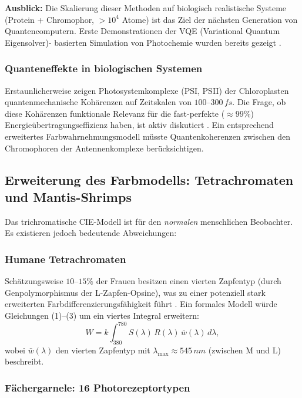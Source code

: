 ﻿\documentclass[a4paper,12pt]{article}
\theoremstyle{definition}
\begin{document}
\textbf{Ausblick:} Die Skalierung dieser Methoden auf biologisch realistische Systeme
(Protein + Chromophor, $> 10^4$ Atome) ist das Ziel der nächsten Generation von
Quantencomputern. Erste Demonstrationen der VQE (Variational Quantum Eigensolver)-
basierten Simulation von Photochemie wurden bereits gezeigt \cite{google2020}.

\subsubsection{Quanteneffekte in biologischen Systemen}

Erstaunlicherweise zeigen Photosystemkomplexe (PSI, PSII) der Chloroplasten
quantenmechanische Kohärenzen auf Zeitskalen von $100$--$300\,\si{fs}$.
Die Frage, ob diese Kohärenzen funktionale Relevanz für die fast-perfekte
($\approx 99\%$) Energieübertragungseffizienz haben, ist aktiv diskutiert
\cite{engel2007}. Ein entsprechend erweitertes Farbwahrnehmungsmodell
müsste Quantenkoherenzen zwischen den Chromophoren der Antennenkomplexe
berücksichtigen.

\subsection{Erweiterung des Farbmodells: Tetrachromaten und Mantis-Shrimps}

Das trichromatische CIE-Modell ist für den \emph{normalen} menschlichen Beobachter.
Es existieren jedoch bedeutende Abweichungen:

\subsubsection{Humane Tetrachromaten}

Schätzungsweise $10$--$15\%$ der Frauen besitzen einen vierten Zapfentyp
(durch Genpolymorphismus der L-Zapfen-Opsine), was zu einer potenziell
stark erweiterten Farbdifferenzierungsfähigkeit führt \cite{jordan2010}.
Ein formales Modell würde Gleichungen (1)--(3) um ein viertes Integral erweitern:
\[
  W = k \int_{380}^{780} S(\lambda)\,R(\lambda)\,\bar{w}(\lambda)\,d\lambda,
\]
wobei $\bar{w}(\lambda)$ den vierten Zapfentyp mit $\lambda_{\max} \approx 545\,\si{nm}$
(zwischen M und L) beschreibt.

\subsubsection{Fächergarnele: 16 Photorezeptortypen}
\end{document}
